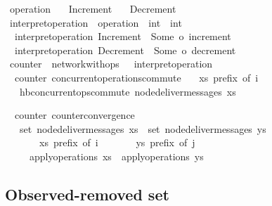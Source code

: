 \begin{isabellebody}
\isamarkupfalse%
\ operation\isanewline
\ \ {\isacharequal}\ Increment\isanewline
\ \ {\isacharbar}\ Decrement\isanewline
\ \ \ \ \isanewline
{}\isamarkupfalse%
\ interpret{\isacharunderscore}operation\ {\isacharcolon}{\isacharcolon}\ {\isachardoublequoteopen}operation\ {\isasymRightarrow}\ int\ {\isasymrightharpoonup}\ int{\isachardoublequoteclose}\ \isanewline
\ \ {\isachardoublequoteopen}interpret{\isacharunderscore}operation\ Increment\ {\isacharequal}\ Some\ o\ increment{\isachardoublequoteclose}\ {\isacharbar}\isanewline
\ \ {\isachardoublequoteopen}interpret{\isacharunderscore}operation\ Decrement\ {\isacharequal}\ Some\ o\ decrement{\isachardoublequoteclose}\isanewline
\ \ \ \ \isanewline
{}\isamarkupfalse%
\ counter\ {\isacharequal}\ network{\isacharunderscore}with{\isacharunderscore}ops\ {\isacharunderscore}\ {\isacharunderscore}\ interpret{\isacharunderscore}operation\ {}\isanewline
\ \ \isanewline
{}\isamarkupfalse%
\ {\isacharparenleft}\ counter{\isacharparenright}\ concurrent{\isacharunderscore}operations{\isacharunderscore}commute{\isacharcolon}\isanewline
\ \ \ {\isachardoublequoteopen}xs\ prefix\ of\ i{\isachardoublequoteclose}\isanewline
\ \ \ {\isachardoublequoteopen}hb{\isachardot}concurrent{\isacharunderscore}ops{\isacharunderscore}commute\ {\isacharparenleft}node{\isacharunderscore}deliver{\isacharunderscore}messages\ xs{\isacharparenright}{\isachardoublequoteclose}\isanewline
\end{isabellebody}

\begin{isabellebody}
\isamarkupfalse%
\ {\isacharparenleft}\ counter{\isacharparenright}\ counter{\isacharunderscore}convergence{\isacharcolon}\isanewline
\ \ \ {\isachardoublequoteopen}set\ {\isacharparenleft}node{\isacharunderscore}deliver{\isacharunderscore}messages\ xs{\isacharparenright}\ {\isacharequal}\ set\ {\isacharparenleft}node{\isacharunderscore}deliver{\isacharunderscore}messages\ ys{\isacharparenright}{\isachardoublequoteclose}\isanewline
\ \ \ \ \ \ \ {\isachardoublequoteopen}xs\ prefix\ of\ i{\isachardoublequoteclose}\isanewline
\ \ \ \ \ \ \ {\isachardoublequoteopen}ys\ prefix\ of\ j{\isachardoublequoteclose}\isanewline
\ \ \ \ \ {\isachardoublequoteopen}apply{\isacharunderscore}operations\ xs\ {\isacharequal}\ apply{\isacharunderscore}operations\ ys{\isachardoublequoteclose}\isanewline
\end{isabellebody}

\subsection{Observed-removed set}
\label{subsect.observed-removed.set}